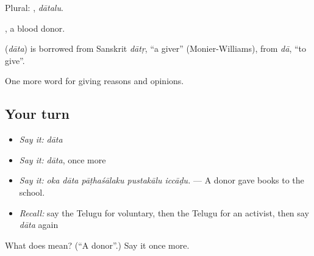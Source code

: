 Plural: , \emph{dātalu}.

, a blood donor.

\begin{cousinweb}
\textbf{} (\emph{dāta}) is borrowed from Sanskrit \emph{dātṛ}, \textquotedblleft{}a giver\textquotedblright{} (Monier-Williams), from \emph{dā}, \textquotedblleft{}to give\textquotedblright{}.
\end{cousinweb}

\begin{grammarlens}[title={What you've built}]
One more word for giving reasons and opinions.
\end{grammarlens}

\subsection*{Your turn}
\begin{itemize}
\raggedright
  \item \emph{Say it:} \emph{dāta}
  \item \emph{Say it:} \emph{dāta}, once more
  \item \emph{Say it:} \emph{oka dāta pāṭhaśālaku pustakālu iccāḍu.} — A donor gave books to the school.
  \item \emph{Recall:} say the Telugu for voluntary, then the Telugu for an activist, then say \emph{dāta} again
\end{itemize}

\begin{tcolorbox}[breakable,colback=teal!4,colframe=teal!35!black,title={Before you move on}]
What does  mean? (\textquotedblleft{}A donor\textquotedblright{}.) Say it once more.
\end{tcolorbox}
